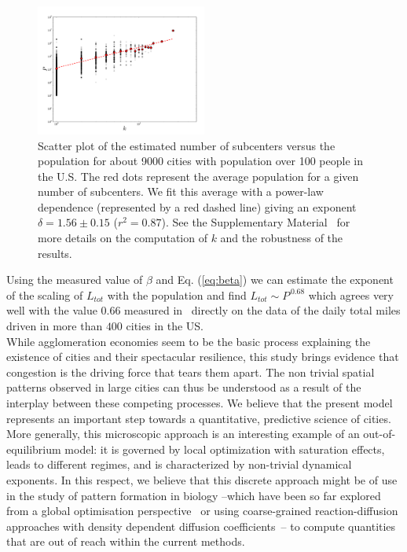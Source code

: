 \begin{figure}
\includegraphics[width=0.5\textwidth]{gfx/chapter-monocentric/5.pdf}
\caption{Scatter plot of the estimated number of subcenters versus the
  population for about 9000 cities with population over 100 people in
  the U.S. The red dots represent the average population for a given
  number of subcenters. We fit this average with a power-law
  dependence (represented by a red dashed line) giving an exponent
  $\delta=1.56\pm 0.15$ ($r^2=0.87$). See the Supplementary Material~\cite{SM} for more details on the computation of $k$ and the robustness of the results. \label{fig:data}}
\end{figure}

Using the measured value of $\beta$ and Eq. (\ref{eq:beta}) we can estimate the exponent of
the scaling of $L_{tot}$ with the population and find $L_{tot} \sim
P^{\,0.68}$ which agrees very well with the value $0.66$ measured
in~\cite{Samaniego:2008} directly on the data of the daily total miles
driven in more than $400$ cities in the US.\\

While agglomeration economies seem to be the basic process explaining
the existence of cities and their spectacular resilience, this study
brings evidence that congestion is the driving force that tears them
apart. The non trivial spatial patterns observed in large cities can
thus be understood as a result of the interplay between these
competing processes. We believe that the present model represents an
important step towards a quantitative, predictive science of
cities. More generally, this microscopic approach is an interesting
example of an out-of-equilibrium model: it is governed by local
optimization with saturation effects, leads to different regimes, and
is characterized by non-trivial dynamical exponents. In this respect,
we believe that this discrete approach might be of use in the study of
pattern formation in biology --which have been so far explored from a
global optimisation perspective~\cite{Ashton:2005} or using
coarse-grained reaction-diffusion approaches with density dependent
diffusion coefficients~\cite{Cates:2012}-- to compute quantities that
are out of reach within the current methods.

